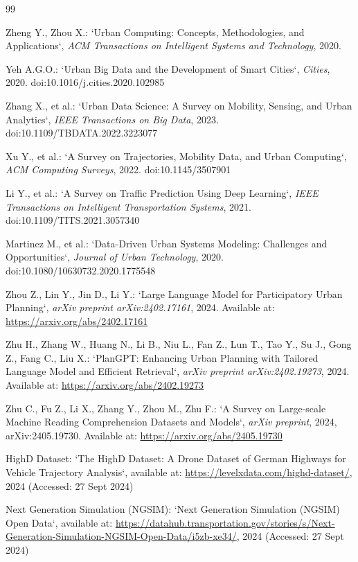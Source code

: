 \documentclass[a4paper,fleqn]{cas-sc}
\begin{document}
\begin{thebibliography}{99}

Zheng Y., Zhou X.:
`Urban Computing: Concepts, Methodologies, and Applications`,
\textit{ACM Transactions on Intelligent Systems and Technology},
2020.

Yeh A.G.O.:
`Urban Big Data and the Development of Smart Cities`,
\textit{Cities},
2020.
doi:10.1016/j.cities.2020.102985

Zhang X., et al.:
`Urban Data Science: A Survey on Mobility, Sensing, and Urban Analytics`,
\textit{IEEE Transactions on Big Data},
2023.
doi:10.1109/TBDATA.2022.3223077

Xu Y., et al.:
`A Survey on Trajectories, Mobility Data, and Urban Computing`,
\textit{ACM Computing Surveys},
2022.
doi:10.1145/3507901

Li Y., et al.:
`A Survey on Traffic Prediction Using Deep Learning`,
\textit{IEEE Transactions on Intelligent Transportation Systems},
2021.
doi:10.1109/TITS.2021.3057340

Martinez M., et al.:
`Data-Driven Urban Systems Modeling: Challenges and Opportunities`,
\textit{Journal of Urban Technology},
2020.
doi:10.1080/10630732.2020.1775548

Zhou Z., Lin Y., Jin D., Li Y.:  
`Large Language Model for Participatory Urban Planning`, \textit{arXiv preprint arXiv:2402.17161}, 2024. Available at: \url{https://arxiv.org/abs/2402.17161}

Zhu H., Zhang W., Huang N., Li B., Niu L., Fan Z., Lun T., Tao Y., Su J., Gong Z., Fang C., Liu X.:  
`PlanGPT: Enhancing Urban Planning with Tailored Language Model and Efficient Retrieval`, \textit{arXiv preprint arXiv:2402.19273}, 2024. Available at: \url{https://arxiv.org/abs/2402.19273}

Zhu C., Fu Z., Li X., Zhang Y., Zhou M., Zhu F.:  
`A Survey on Large-scale Machine Reading Comprehension Datasets and Models`, \textit{arXiv preprint}, 2024, arXiv:2405.19730. Available at: \url{https://arxiv.org/abs/2405.19730}

HighD Dataset:  
`The HighD Dataset: A Drone Dataset of German Highways for Vehicle Trajectory Analysis`, available at: \url{https://levelxdata.com/highd-dataset/}, 2024 (Accessed: 27 Sept 2024)

Next Generation Simulation (NGSIM):  
`Next Generation Simulation (NGSIM) Open Data`, available at: \url{https://datahub.transportation.gov/stories/s/Next-Generation-Simulation-NGSIM-Open-Data/i5zb-xe34/}, 2024 (Accessed: 27 Sept 2024)


\end{thebibliography}
\end{document}
